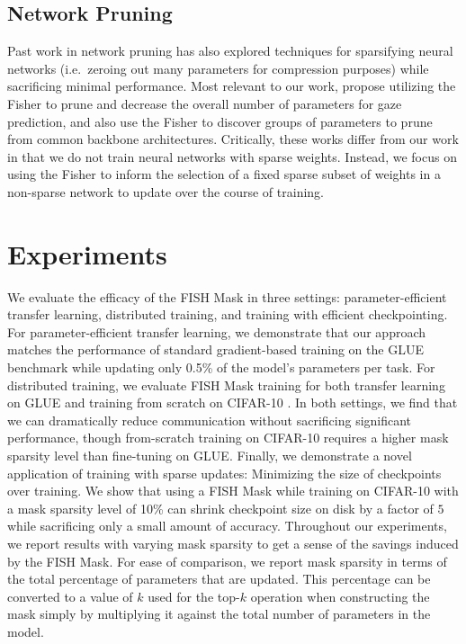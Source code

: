 \subsection{Network Pruning} \label{ssec:network_pruning}
Past work in network pruning has also explored techniques for sparsifying neural networks (i.e.\ zeroing out many parameters for compression purposes) while sacrificing minimal performance. Most relevant to our work, \citet{DBLP:journals/corr/abs-1801-05787} propose utilizing the Fisher to prune and decrease the overall number of parameters for gaze prediction, and \citet{pmlr-v139-liu21ab} also use the Fisher to discover groups of parameters to prune from common backbone architectures. Critically, these works differ from our work in that we do not train neural networks with sparse weights. Instead, we focus on using the Fisher to inform the selection of a fixed sparse subset of weights in a non-sparse network to update over the course of training.

\section{Experiments}
\label{sec:experiments}

We evaluate the efficacy of the FISH Mask in three settings: parameter-efficient transfer learning, distributed training, and training with efficient checkpointing. For parameter-efficient transfer learning, we demonstrate that our approach matches the performance of standard gradient-based training on the GLUE benchmark \citep{wang-glue-2018} while updating only 0.5\% of the model's parameters per task. For distributed training, we evaluate FISH Mask training for both transfer learning on GLUE and training from scratch on CIFAR-10 \citep{Krizhevsky2009LearningML}. In both settings, we find that we can dramatically reduce communication without sacrificing significant performance, though from-scratch training on CIFAR-10 requires a higher mask sparsity level than fine-tuning on GLUE. Finally, we demonstrate a novel application of training with sparse updates: Minimizing the size of checkpoints over training. We show that using a FISH Mask while training on CIFAR-10 with a mask sparsity level of 10\% can shrink checkpoint size on disk by a factor of $5$ while sacrificing only a small amount of accuracy. Throughout our experiments, we report results with varying mask sparsity to get a sense of the savings induced by the FISH Mask. For ease of comparison, we report mask sparsity in terms of the total percentage of parameters that are updated. This percentage can be converted to a value of $k$ used for the top-$k$ operation when constructing the mask simply by multiplying it against the total number of parameters in the model.

